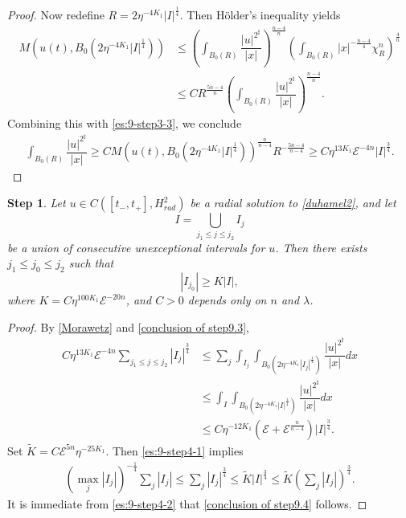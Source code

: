\documentclass[11pt,a4paper]{article}
\numberwithin{equation}{section}
\newtheorem{step}{Step}[section]
\begin{document}
\begin{proof}
Now redefine $R = 2\eta^{-4K_{1}}|I|^{\frac{1}{4}}$. Then H\"older's inequality yields
\begin{align*}
M\left(u(t), B_{0}(2\eta^{-4K_{1}}|I|^{\frac{1}{4}})\right)
&\leq \left( \int_{B_{0}(R)} \dfrac{|u|^{2^{\sharp}}}{|x|} \right)^{\frac{n-4}{n}}
\left( \int_{B_{0}(R)} |x|^{-\frac{n-4}{4}}\chi_{R}^{n} \right)^{\frac{4}{n}} \\
&\leq CR^{\frac{5n -4}{n}}\left( \int_{B_{0}(R)} \dfrac{|u|^{2^{\sharp}}}{|x|} \right)^{\frac{n-4}{n}}.
\end{align*}
Combining this with \eqref{es:9-step3-3}, we conclude
\begin{align*}
\int_{B_{0}(R)} \dfrac{|u|^{2^{\sharp}}}{|x|}
\geq C M\left(u(t), B_{0}(2\eta^{-4K_{1}}|I|^{\frac{1}{4}})\right)^{\frac{n}{n-4}} R^{-\frac{5n-4}{n-4}}
\geq C\eta^{13K_{1}}\mathcal{E}^{-4n}|I|^{\frac{3}{4}}.
\end{align*}
\end{proof}

\begin{step}\label{step4}
Let $u \in C([t_{-}, t_{+}], H^{2}_{rad})$ be a radial solution to \eqref{duhamel2}, and let
\[
I = \bigcup_{j_{1} \leq j \leq j_{2}}I_{j}
\]
be a union of consecutive unexceptional intervals for $u$.
Then there exists $j_{1} \leq j_{0} \leq j_{2}$ such that
\begin{equation}\label{conclusion of step9.4}
|I_{j_{0}}| \geq K|I|,
\end{equation}
where $K = C\eta^{100K_{1}}\mathcal{E}^{-20n}$, and $C>0$ depends only on $n$ and $\lambda$.
\end{step}

\begin{proof}
By \eqref{Morawetz} and \eqref{conclusion of step9.3},
\begin{equation}\label{es:9-step4-1}
\begin{aligned}
C\eta^{13K_{1}}\mathcal{E}^{-4n}\sum_{j_{1} \leq j \leq j_{2}}|I_{j}|^{\frac{3}{4}}
&\leq \sum_{j}\int_{I_{j}}\int_{B_{0}(2\eta^{-4K_{1}}|I_{j}|^{\frac{1}{4}})} \dfrac{|u|^{2^{\sharp}}}{|x|} dx \\
&\leq \int_{I}\int_{B_{0}(2\eta^{-4K_{1}}|I|^{\frac{1}{4}})}\dfrac{|u|^{2^{\sharp}}}{|x|} dx \\
&\leq C\eta^{-12K_{1}}\left( \mathcal{E} + \mathcal{E}^{\frac{n}{n-4}}\right)|I|^{\frac{3}{4}}.
\end{aligned}
\end{equation}
Set $\tilde{K} = C\mathcal{E}^{5n}\eta^{-25K_{1}}$. Then \eqref{es:9-step4-1} implies
\begin{equation}\label{es:9-step4-2}
\begin{aligned}
\left( \max_{j}|I_{j}| \right)^{-\frac{1}{4}}\sum_{j}|I_{j}|
\leq \sum_{j}|I_{j}|^{\frac{3}{4}}
\leq \tilde{K}|I|^{\frac{3}{4}}
\leq \tilde{K}\left( \sum_{j}|I_{j}| \right)^{\frac{3}{4}}.
\end{aligned}
\end{equation}
It is immediate from \eqref{es:9-step4-2} that \eqref{conclusion of step9.4} follows.
\end{proof}
\end{document}

